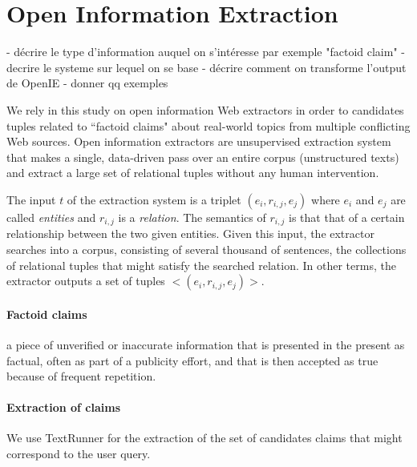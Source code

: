\section{Open Information Extraction}
-  décrire le type d'information auquel on s'intéresse par exemple "factoid claim"
- decrire le systeme sur lequel on se base
- décrire comment on transforme l'output de OpenIE
- donner qq exemples

We rely in this study on open information Web extractors in order to candidates tuples 
related to ``factoid claims" about real-world topics from multiple conflicting Web sources.
Open information extractors are unsupervised extraction system that makes a single, data-driven
pass over an entire corpus (unstructured texts) and extract a large set of relational tuples without 
any human intervention.

The input $t$ of the extraction system is a triplet $(e_i, r_{i,j}, e_j)$ where $e_i$ and $e_j$ are called
\emph{entities} and $r_{i,j}$ is a \emph{relation}. The semantics of $r_{i,j}$ is that that of a certain 
relationship between the two given entities. Given this input, the extractor searches into a corpus, consisting
of several thousand of sentences, the collections of relational tuples that might satisfy the searched relation.
In other terms, the extractor outputs a set of tuples $<(e_i, r_{i,j}, e_j)>$.

\paragraph*{Factoid claims} a piece of unverified or inaccurate information that is
presented in the present as factual, often as part of a publicity effort, and that is 
then accepted as true because of frequent repetition.
\paragraph*{Extraction of claims}We use TextRunner for the extraction of the set of 
candidates claims that might correspond to the user query.